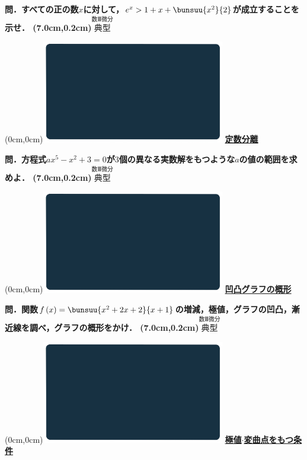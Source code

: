 \documentclass[10pt,
fleqn,
dvipdfmx,
uplatex
]{jsarticle}
\begin{document}
\LARGE 
\bf\boldmath 問．すべての正の数$x$に対して，$e^x>1+x+\bunsuu{{x^2}}{2}$が成立することを示せ．
\at(7.0cm,0.2cm){\small\color{bradorange}$\overset{\text{数Ⅲ微分}}{\text{典型}}$}


\newpage



\at(0cm,0cm){\includegraphics[width=8cm,bb=0 0 1920 1080]{./youtube/thumbnails/templates/smart_background/数III微分.jpeg}}
{\color{orange}\bf\boldmath\huge\underline{定数分離}}\vspace{0.3zw}

\LARGE 
\bf\boldmath 問．方程式$ax^5-x^2+3=0$が$3$個の異なる実数解をもつような$a$の値の範囲を求めよ．
\at(7.0cm,0.2cm){\small\color{bradorange}$\overset{\text{数Ⅲ微分}}{\text{典型}}$}


\newpage



\at(0cm,0cm){\includegraphics[width=8cm,bb=0 0 1920 1080]{./youtube/thumbnails/templates/smart_background/数III微分.jpeg}}
{\color{orange}\bf\boldmath\huge\underline{凹凸グラフの概形}}\vspace{0.3zw}

\Large 
\bf\boldmath 問．関数$f\left(x\right)=\bunsuu{{x^2+2x+2}}{{x+1}}$の増減，極値，グラフの凹凸，漸近線を調べ，グラフの概形をかけ．
\at(7.0cm,0.2cm){\small\color{bradorange}$\overset{\text{数Ⅲ微分}}{\text{典型}}$}


\newpage



\at(0cm,0cm){\includegraphics[width=8cm,bb=0 0 1920 1080]{./youtube/thumbnails/templates/smart_background/数III微分.jpeg}}
{\color{orange}\bf\boldmath\LARGE\underline{極値$\cdot$変曲点をもつ条件}}\vspace{0.3zw}
\end{document}
